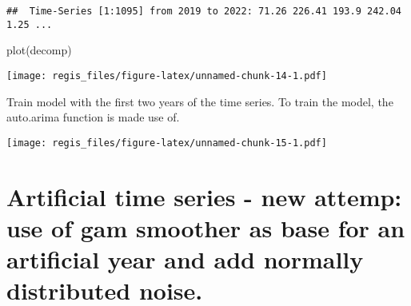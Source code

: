 \documentclass[
]{article}
\newenvironment{Shaded}{\begin{snugshade}}{\end{snugshade}}
\newcommand{\AttributeTok}[1]{\textcolor[rgb]{0.77,0.63,0.00}{#1}}
\newcommand{\DecValTok}[1]{\textcolor[rgb]{0.00,0.00,0.81}{#1}}
\newcommand{\FloatTok}[1]{\textcolor[rgb]{0.00,0.00,0.81}{#1}}
\newcommand{\FunctionTok}[1]{\textcolor[rgb]{0.00,0.00,0.00}{#1}}
\newcommand{\NormalTok}[1]{#1}
\newcommand{\OtherTok}[1]{\textcolor[rgb]{0.56,0.35,0.01}{#1}}
\newcommand{\SpecialCharTok}[1]{\textcolor[rgb]{0.00,0.00,0.00}{#1}}
\newcommand{\StringTok}[1]{\textcolor[rgb]{0.31,0.60,0.02}{#1}}
\begin{document}
\begin{verbatim}
##  Time-Series [1:1095] from 2019 to 2022: 71.26 226.41 193.9 242.04 1.25 ...
\end{verbatim}

\begin{Shaded}
\begin{Highlighting}[]
\FunctionTok{plot}\NormalTok{(decomp)}
\end{Highlighting}
\end{Shaded}

\texttt{[image: regis\_files/figure-latex/unnamed-chunk-14-1.pdf]}

Train model with the first two years of the time series. To train the
model, the auto.arima function is made use of.

\begin{Shaded}
\end{Shaded}

\texttt{[image: regis\_files/figure-latex/unnamed-chunk-15-1.pdf]}

\hypertarget{artificial-time-series---new-attemp-use-of-gam-smoother-as-base-for-an-artificial-year-and-add-normally-distributed-noise.}{%
\section{Artificial time series - new attemp: use of gam smoother as
base for an artificial year and add normally distributed
noise.}\label{artificial-time-series---new-attemp-use-of-gam-smoother-as-base-for-an-artificial-year-and-add-normally-distributed-noise.}}
\end{document}
